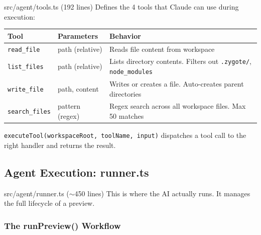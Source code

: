 \documentclass[12pt, a4paper]{article}
\begin{document}
\begin{filebox}{src/agent/tools.ts \quad (192 lines)}
Defines the 4 tools that Claude can use during execution:
\end{filebox}

\begin{table}[H]
\centering
\begin{tabular}{@{}p{3cm}p{3.5cm}p{6.5cm}@{}}
\toprule
\textbf{Tool} & \textbf{Parameters} & \textbf{Behavior} \\
\midrule
\texttt{read\_file} & path (relative) & Reads file content from workspace \\
\texttt{list\_files} & path (relative) & Lists directory contents. Filters out \texttt{.zygote/}, \texttt{node\_modules} \\
\texttt{write\_file} & path, content & Writes or creates a file. Auto-creates parent directories \\
\texttt{search\_files} & pattern (regex) & Regex search across all workspace files. Max 50 matches \\
\bottomrule
\end{tabular}
\end{table}

\texttt{executeTool(workspaceRoot, toolName, input)} dispatches a tool call to the right handler and returns the result.

\subsection{Agent Execution: runner.ts}

\begin{filebox}{src/agent/runner.ts \quad ($\sim$450 lines)}
This is where the AI actually runs. It manages the full lifecycle of a preview.
\end{filebox}

\subsubsection{The runPreview() Workflow}
\end{document}
